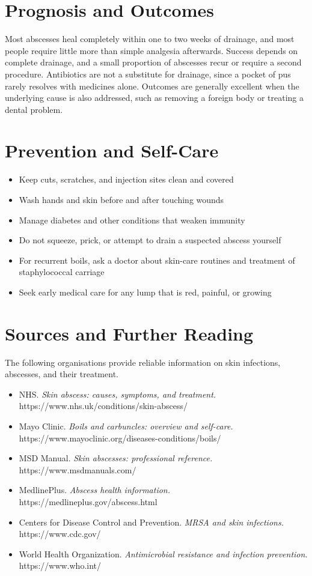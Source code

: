 \section*{Prognosis and Outcomes}
Most abscesses heal completely within one to two weeks of drainage, and most people require little more than simple analgesia afterwards. Success depends on complete drainage, and a small proportion of abscesses recur or require a second procedure. Antibiotics are not a substitute for drainage, since a pocket of pus rarely resolves with medicines alone. Outcomes are generally excellent when the underlying cause is also addressed, such as removing a foreign body or treating a dental problem.

\section*{Prevention and Self-Care}
\begin{itemize}
    \item Keep cuts, scratches, and injection sites clean and covered
    \item Wash hands and skin before and after touching wounds
    \item Manage diabetes and other conditions that weaken immunity
    \item Do not squeeze, prick, or attempt to drain a suspected abscess yourself
    \item For recurrent boils, ask a doctor about skin-care routines and treatment of staphylococcal carriage
    \item Seek early medical care for any lump that is red, painful, or growing
\end{itemize}

\section*{Sources and Further Reading}
The following organisations provide reliable information on skin infections, abscesses, and their treatment.

\begin{itemize}
    \item NHS. \textit{Skin abscess: causes, symptoms, and treatment.} https://www.nhs.uk/conditions/skin-abscess/
    \item Mayo Clinic. \textit{Boils and carbuncles: overview and self-care.} https://www.mayoclinic.org/diseases-conditions/boils/
    \item MSD Manual. \textit{Skin abscesses: professional reference.} https://www.msdmanuals.com/
    \item MedlinePlus. \textit{Abscess health information.} https://medlineplus.gov/abscess.html
    \item Centers for Disease Control and Prevention. \textit{MRSA and skin infections.} https://www.cdc.gov/
    \item World Health Organization. \textit{Antimicrobial resistance and infection prevention.} https://www.who.int/
\end{itemize}
